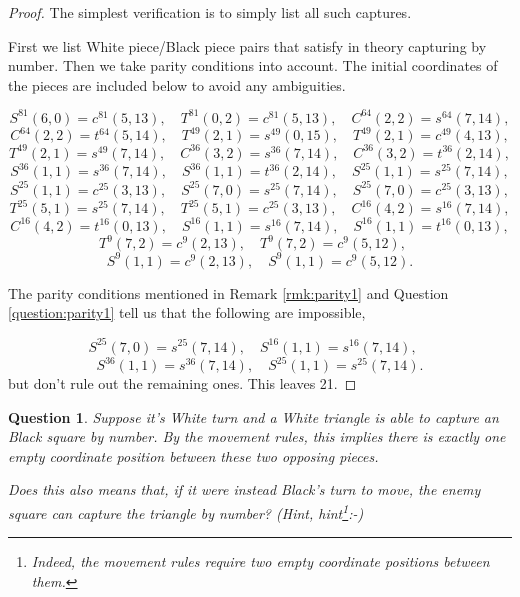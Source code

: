 \documentclass[14pt]{extarticle}
\newtheorem{question}{Question}
\begin{document}
\begin{proof}
The simplest verification is to simply list all such captures.

First we list White piece/Black piece pairs that satisfy in theory
capturing by number. Then we take parity conditions into account.
The initial coordinates of the pieces are included below to avoid
any ambiguities.

{\small{
\[
S^{81} (6, 0)  =  c^{81} (5, 13),\quad
T^{81} (0, 2)  =  c^{81} (5, 13),\quad
C^{64} (2, 2)  =  s^{64} (7, 14),
\]
\[
C^{64} (2, 2)  =  t^{64} (5, 14),\quad
T^{49} (2, 1)  =  s^{49} (0, 15),\quad
T^{49} (2, 1)  =  c^{49} (4, 13),
\]
\[
T^{49} (2, 1)  =  s^{49} (7, 14),\quad
C^{36} (3, 2)  =  s^{36} (7, 14),\quad
C^{36} (3, 2)  =  t^{36} (2, 14),
\]
\[
S^{36} (1, 1)  =  s^{36} (7, 14),\quad
S^{36} (1, 1)  =  t^{36} (2, 14),\quad
S^{25} (1, 1)  =  s^{25} (7, 14),
\]
\[
S^{25} (1, 1)  =  c^{25} (3, 13),\quad
S^{25} (7, 0)  =  s^{25} (7, 14),\quad
S^{25} (7, 0)  =  c^{25} (3, 13),
\]
\[
T^{25} (5, 1)  =  s^{25} (7, 14),\quad
T^{25} (5, 1)  =  c^{25} (3, 13),\quad
C^{16} (4, 2)  =  s^{16} (7, 14),
\]
\[
C^{16} (4, 2)  =  t^{16} (0, 13),\quad
S^{16} (1, 1)  =  s^{16} (7, 14),\quad
S^{16} (1, 1)  =  t^{16} (0, 13),
\]
\[
T^{9} (7, 2)  =  c^{9} (2, 13),\quad
T^{9} (7, 2)  =  c^{9} (5, 12),\quad
\]
\[
S^{9} (1, 1)  =  c^{9} (2, 13),\quad
S^{9} (1, 1)  =  c^{9} (5, 12).
\]
}}

The parity conditions mentioned in Remark \ref{rmk:parity1} and
Question \ref{question:parity1} tell us that the following are impossible,

\[
S^{25} (7, 0)  =  s^{25} (7, 14),\quad
S^{16} (1, 1)  =  s^{16} (7, 14),\quad
\]
\[
S^{36} (1, 1)  =  s^{36} (7, 14),\quad
S^{25} (1, 1)  =  s^{25} (7, 14).
\]
but don't rule out the remaining ones.
This leaves 21.
\end{proof}

\begin{question}
%
Suppose it's White turn and a White triangle is able to
capture an Black square by number. By the movement rules, this implies
there is exactly {\it one} empty coordinate position between these
two opposing pieces.

Does this also means that, if it were instead Black's turn to move,
the enemy square can capture the triangle by number?
(Hint, hint\footnote{Indeed, the movement rules require {\it two} empty coordinate positions between them.}:-)
%
\end{question}
\end{document}
